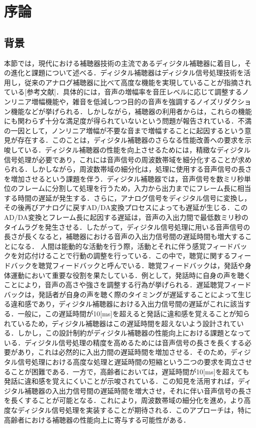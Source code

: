 \chapter{序論}

\section{背景}
本節では，現代における補聴器技術の主流であるディジタル補聴器に着目し，その進化と課題について述べる．ディジタル補聴器はディジタル信号処理技術を活用し，従来のアナログ補聴器に比べて高度な機能を実現していることが指摘されている[参考文献]．具体的には，音声の増幅率を音圧レベルに応じて調整するノンリニア増幅機能や，雑音を低減しつつ目的の音声を強調するノイズリダクション機能などが挙げられる．しかしながら，補聴器の利用者からは，これらの機能にも関わらず十分な満足度が得られていないという問題が報告されている．不満の一因として，ノンリニア増幅が不要な音まで増幅することに起因するという意見が存在する．このことは，ディジタル補聴器のさらなる性能改善への要求を示唆している．ディジタル補聴器の性能を向上させるためには，精緻なディジタル信号処理が必要であり，これには音声信号の周波数帯域を細分化することが求められる．しかしながら，周波数帯域の細分化は，処理に使用する音声信号の長さを増加させるという課題を伴う．ディジタル補聴器では，音声信号を数ミリ秒単位のフレームに分割して処理を行うため，入力から出力までにフレーム長に相当する時間の遅延が発生する．さらに，アナログ信号をディジタル信号に変換し，その後再びアナログに戻すAD/DA変換プロセスによっても遅延が生じる．このAD/DA変換とフレーム長に起因する遅延は，音声の入出力間で最低数ミリ秒のタイムラグを発生させる．したがって，ディジタル信号処理に用いる音声信号の長さが長くなると，補聴器における音声の入出力信号間の遅延時間も増大することになる．
人間は能動的な活動を行う際，活動とそれに伴う感覚フィードバックを対応付けることで行動の調整を行っている．この中で，聴覚に関するフィードバックを聴覚フィードバックと呼んでいる．聴覚フィードバックは，発話や身体運動において重要な役割を果たしている．例として，発話時に自身の声を聴くことにより，音声の高さや強さを調整する行為が挙げられる．遅延聴覚フィードバックは，発話者が自身の声を聴く際のタイミングが遅延することによって生じる違和感であり，ディジタル補聴器における入出力信号間の遅延がこれに該当する．一般に，この遅延時間が10[ms]を超えると発話に違和感を覚えることが知られているため，ディジタル補聴器はこの遅延時間を超えないよう設計されている．しかし，この設計制約がディジタル補聴器の性能向上における課題となっている．ディジタル信号処理の精度を高めるためには音声信号の長さを長くする必要があり，これは必然的に入出力間の遅延時間を増加させる．そのため，ディジタル信号処理における高度な処理と遅延時間の短縮という二つの要求を両立させることが困難である．一方で，高齢者においては，遅延時間が10[ms]を超えても発話に違和感を覚えにくいことが示唆されている．この知見を活用すれば，ディジタル補聴器の入出力信号間の遅延時間を増大させ，それに伴い音声信号の長さを長くすることが可能となる．これにより，周波数帯域の細分化を進め，より高度なディジタル信号処理を実装することが期待される．このアプローチは，特に高齢者における補聴器の性能向上に寄与する可能性がある．
